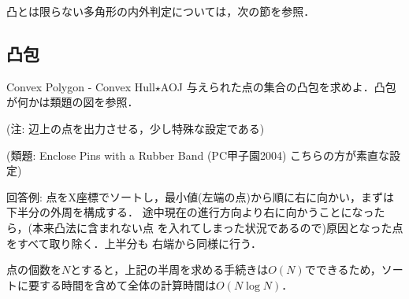 凸とは限らない多角形の内外判定については，次の節を参照．

\subsection{凸包}

\begin{pbox}{Convex Polygon - Convex Hull$\star$}{AOJ}
与えられた点の集合の凸包を求めよ．凸包が何かは類題の図を参照．

(注: 辺上の点を出力させる，少し特殊な設定である)


(類題: Enclose Pins with a Rubber Band (PC甲子園2004)  こちらの方が素直な設定)
\end{pbox}

回答例: 点をX座標でソートし，最小値(左端の点)から順に右に向かい，まずは下半分の外周を構成する．
途中現在の進行方向より右に向かうことになったら，(本来凸法に含まれない点
を入れてしまった状況であるので)原因となった点をすべて取り除く．上半分も
右端から同様に行う．

点の個数を$N$とすると，上記の半周を求める手続きは$O(N)$でできるため，ソートに要する時間を含めて全体の計算時間は$O(N\log N)$．

